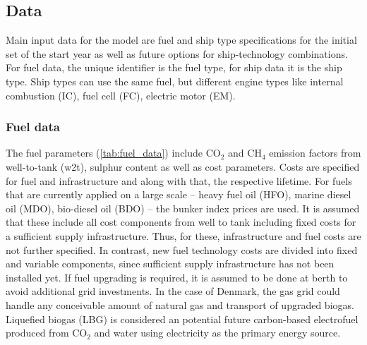 \documentclass[article]{elsarticle}
\begin{document}
\subsection{Data}
\label{subsec:Dat}
Main input data for the model are fuel and ship type specifications for the initial set of the start year as well as future options for ship-technology combinations. For fuel data, the unique identifier is the fuel type, for ship data it is the ship type. Ship types can use the same fuel, but different engine types like internal combustion (IC), fuel cell (FC), electric motor (EM).

\subsubsection{Fuel data}
The fuel parameters (\autoref{tab:fuel_data}) include CO$_2$ and CH$_4$ emission factors from well-to-tank (w2t), sulphur content as well as cost parameters. Costs are specified for fuel and infrastructure and along with that, the respective lifetime. For fuels that are currently applied on a large scale -- heavy fuel oil (HFO), marine diesel oil (MDO), bio-diesel oil (BDO) -- the bunker index prices are used. It is assumed that these include all cost components from well to tank including fixed costs for a sufficient supply infrastructure. Thus, for these, infrastructure and fuel costs are not further specified. In contrast, new fuel technology costs are divided into fixed and variable components, since sufficient supply infrastructure has not been installed yet. If fuel upgrading is required, it is assumed to be done at berth to avoid additional grid investments. In the case of Denmark, the gas grid could handle any conceivable amount of natural gas and transport of upgraded biogas. Liquefied biogas (LBG) is considered an potential future carbon-based electrofuel produced from CO$_2$ and water using electricity as the primary energy source.
\end{document}
